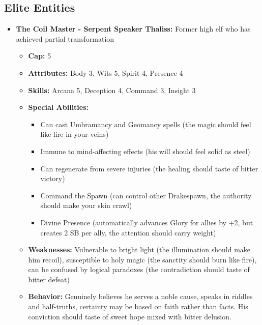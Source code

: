 \documentclass[11pt]{article}
\begin{document}
\begin{itemize}
\subsection{Elite Entities}
\begin{itemize}
\item \textbf{The Coil Master - Serpent Speaker Thaliss:} Former high elf who has achieved partial transformation
  \begin{itemize}
  \item \textbf{Cap:} 5
  \item \textbf{Attributes:} Body 3, Wits 5, Spirit 4, Presence 4
  \item \textbf{Skills:} Arcana 5, Deception 4, Command 3, Insight 3
  \item \textbf{Special Abilities:}
    \begin{itemize}
    \item Can cast Umbramancy and Geomancy spells (the magic should feel like fire in your veins)
    \item Immune to mind-affecting effects (his will should feel solid as steel)
    \item Can regenerate from severe injuries (the healing should taste of bitter victory)
    \item Command the Spawn (can control other Drakespawn, the authority should make your skin crawl)
    \item Divine Presence (automatically advances Glory for allies by +2, but creates 2 SB per ally, the attention should carry weight)
    \end{itemize}
  \item \textbf{Weaknesses:} Vulnerable to bright light (the illumination should make him recoil), susceptible to holy magic (the sanctity should burn like fire), can be confused by logical paradoxes (the contradiction should taste of bitter defeat)
  \item \textbf{Behavior:} Genuinely believes he serves a noble cause, speaks in riddles and half-truths, certainty may be based on faith rather than facts. His conviction should taste of sweet hope mixed with bitter delusion.

\end{itemize}
\end{itemize}
\end{itemize}
\end{document}
